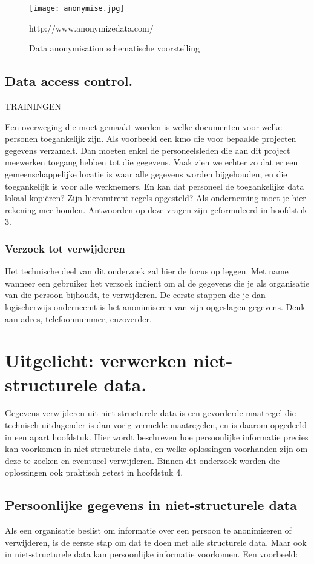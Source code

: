 \begin{figure}[h]
	\texttt{[image: anonymise.jpg]}
	\caption{Data anonymisation schematische voorstelling}
	http://www.anonymizedata.com/
\end{figure}


\subsection{Data access control.}
TRAININGEN 

Een overweging die moet gemaakt worden is welke documenten voor welke personen toegankelijk zijn. Als voorbeeld een kmo die voor bepaalde projecten gegevens verzamelt. Dan moeten enkel de personeelsleden die aan dit project meewerken toegang hebben tot die gegevens.  Vaak zien we echter zo dat er een gemeenschappelijke locatie is waar alle gegevens worden bijgehouden, en die toegankelijk is voor alle werknemers. 
En kan dat personeel de toegankelijke data lokaal kopiëren? Zijn hieromtrent regels opgesteld? Als onderneming moet je hier rekening mee houden. Antwoorden op deze vragen zijn geformuleerd in hoofdstuk 3. 

\subsubsection{Verzoek tot verwijderen}
Het technische deel van dit onderzoek zal hier de focus op leggen. Met name wanneer een gebruiker het verzoek indient om al de gegevens die je als organisatie van die persoon bijhoudt, te verwijderen. De eerste stappen die je dan logischerwijs onderneemt is het anonimiseren van zijn opgeslagen gegevens. Denk aan adres, telefoonnummer, enzoverder. 

 

\section{Uitgelicht: verwerken niet-structurele data.}

Gegevens verwijderen uit niet-structurele data is een gevorderde maatregel die technisch uitdagender is dan vorig vermelde maatregelen, en is daarom opgedeeld in een apart hoofdstuk. Hier wordt 
beschreven hoe persoonlijke informatie precies kan voorkomen in niet-structurele data, en welke oplossingen voorhanden zijn om deze te zoeken en eventueel verwijderen. Binnen dit onderzoek
worden die oplossingen ook praktisch getest in hoofdstuk 4. 

\subsection{Persoonlijke gegevens in niet-structurele data}
Als een organisatie beslist om informatie over een persoon te anonimiseren of verwijderen, is de eerste stap om dat te doen met alle structurele data. Maar ook in niet-structurele data kan persoonlijke informatie voorkomen. Een voorbeeld: 

